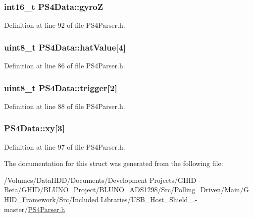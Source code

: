 \hypertarget{struct_p_s4_data_ace15cafba1570d56951e7db7947ba94c}{
\subsubsection[{gyro\-Z}]{\setlength{\rightskip}{0pt plus 5cm}int16\-\_\-t {\bf \-P\-S4\-Data\-::gyro\-Z}}}\label{struct_p_s4_data_ace15cafba1570d56951e7db7947ba94c}


\-Definition at line 92 of file \-P\-S4\-Parser.\-h.

\hypertarget{struct_p_s4_data_aa004cc456c79269dec99a9eed667484d}{
\subsubsection[{hat\-Value}]{\setlength{\rightskip}{0pt plus 5cm}uint8\-\_\-t {\bf \-P\-S4\-Data\-::hat\-Value}\mbox{[}4\mbox{]}}}\label{struct_p_s4_data_aa004cc456c79269dec99a9eed667484d}


\-Definition at line 86 of file \-P\-S4\-Parser.\-h.

\hypertarget{struct_p_s4_data_aad2133de0113cee402cda4a8c7e8b6a5}{
\subsubsection[{trigger}]{\setlength{\rightskip}{0pt plus 5cm}uint8\-\_\-t {\bf \-P\-S4\-Data\-::trigger}\mbox{[}2\mbox{]}}}\label{struct_p_s4_data_aad2133de0113cee402cda4a8c7e8b6a5}


\-Definition at line 88 of file \-P\-S4\-Parser.\-h.

\hypertarget{struct_p_s4_data_a1cfd90d32bbd9233dae34fb148fc9f56}{
\subsubsection[{xy}]{ {\bf \-P\-S4\-Data\-::xy}\mbox{[}3\mbox{]}}}\label{struct_p_s4_data_a1cfd90d32bbd9233dae34fb148fc9f56}


\-Definition at line 97 of file \-P\-S4\-Parser.\-h.



\-The documentation for this struct was generated from the following file\-:\begin{DoxyCompactItemize}
\item 
/\-Volumes/\-Data\-H\-D\-D/\-Documents/\-Development Projects/\-G\-H\-I\-D -\/ Beta/\-G\-H\-I\-D/\-B\-L\-U\-N\-O\-\_\-\-Project/\-B\-L\-U\-N\-O\-\_\-\-A\-D\-S1298/\-Src/\-Polling\-\_\-\-Driven/\-Main/\-G\-H\-I\-D\-\_\-\-Framework/\-Src/\-Included Libraries/\-U\-S\-B\-\_\-\-Host\-\_\-\-Shield\-\_.-\/master/\hyperlink{_p_s4_parser_8h}{\-P\-S4\-Parser.\-h}\end{DoxyCompactItemize}
